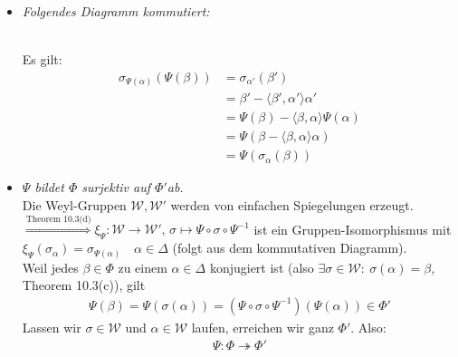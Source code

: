 \documentclass[a4paper,12pt]{article}
\begin{document}
\begin{itemize}
\begin{itemize}
\item \emph{Folgendes Diagramm kommutiert: }\\
 \\
Es gilt: 
	\begin{align*}
	\sigma_{\Psi(\alpha)}(\Psi(\beta)) &= \sigma_{\alpha'} (\beta')\\
	&= \beta'-\langle\beta',\alpha'\rangle\alpha'\\
	&=\Psi (\beta) - \langle\beta,\alpha\rangle\Psi (\alpha)\\
	&= \Psi (\beta - \langle\beta,\alpha\rangle \alpha)\\
	&= \Psi (\sigma_\alpha (\beta))
	\end{align*}
	\item \emph{$\Psi$ bildet $\Phi$ surjektiv auf $\Phi'$ab.} \\
Die Weyl-Gruppen $\mathcal{W}, \mathcal{W}'$ werden von einfachen Spiegelungen erzeugt.\\
$ \overset{\text{Theorem 10.3(d)}}{\Longrightarrow} \xi_\Psi: \mathcal{W} \rightarrow \mathcal{W'},\, \sigma \mapsto \Psi\circ\sigma\circ\Psi^{-1}$ ist ein Gruppen-Isomorphismus mit $\xi_\Psi (\sigma_\alpha) = \sigma_{\Psi(\alpha)} \quad \alpha \in \Delta$ (folgt aus dem kommutativen Diagramm).\\
Weil jedes $\beta\in\Phi$ zu einem $\alpha\in\Delta$ konjugiert ist (also $\exists \sigma\in\mathcal{W}:\: \sigma (\alpha)=\beta$, Theorem 10.3(c)), gilt
\begin{align*}
\Psi(\beta) = \Psi(\sigma(\alpha)) = (\Psi\circ\sigma\circ\Psi^{-1} )(\Psi(\alpha)) \in \Phi'
\end{align*}
Lassen wir $\sigma\in\mathcal{W}$ und $\alpha\in\mathcal{W}$ laufen, erreichen wir ganz $\Phi'$. Also:
\begin{align*}
\Psi: \Phi \twoheadrightarrow \Phi'
\end{align*}


\end{itemize}
\end{itemize}
\end{document}
